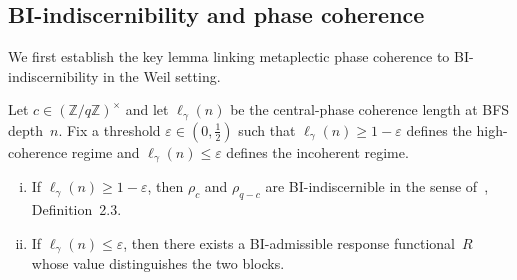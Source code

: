   \subsection{BI-indiscernibility and phase coherence}
    \label{subsec:q1-lemma}

    We first establish the key lemma linking metaplectic phase coherence to
    BI-indiscernibility in the Weil setting.

    \begin{lemma}
      \label{lem:coherence-indiscernibility}
      Let $c \in (\mathbb{Z}/q\mathbb{Z})^\times$ and let $\ell_\gamma(n)$ be the
      central-phase coherence length at BFS depth~$n$.
      Fix a threshold $\varepsilon \in (0, \tfrac{1}{2})$ such that
      $\ell_\gamma(n) \geq 1 - \varepsilon$ defines the high-coherence regime and
      $\ell_\gamma(n) \leq \varepsilon$ defines the incoherent regime.
      \begin{enumerate}[(i)]
  \item If $\ell_\gamma(n) \geq 1 - \varepsilon$, then $\rho_c$ and $\rho_{q-c}$
  are BI-indiscernible in the sense of~\cite{O18}, Definition~2.3.
  \item If $\ell_\gamma(n) \leq \varepsilon$, then there exists a BI-admissible
  response functional~$R$ whose value distinguishes the two blocks.
      \end{enumerate}
    \end{lemma}

